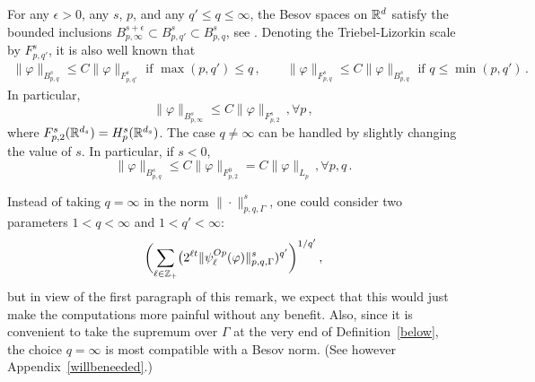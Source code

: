 \documentclass[10pt,twoside]{amsart}
\begin{document}
\begin{remark}\label{qqq}
For  any $\epsilon >0$, any $s$, $p$, and any $q'\le q\le \infty$,
the  Besov spaces on $\mathbb{R}^d$ satisfy the bounded inclusions
$B^{s+\epsilon}_{p,\infty}\subset  B^s_{p,q'}\subset B^{s}_{p,q}$, see \cite[\S 2.2.1]{RS}.
Denoting the Triebel-Lizorkin scale by $F^s_{p,q'}$,
it is also well known 
\cite[\S 2.2.2]{RS}  that 
\begin{align}\label{cumbersome}
\|\varphi\|_{B^s_{p,q}}\le C \|\varphi\|_{F^s_{p,q'}}
\mbox{ if }\max(p,q')\le q\, , \qquad
\|\varphi\|_{F^s_{p,q}}\le C \|\varphi\|_{B^s_{p,q}}
\mbox{ if } q \le \min(p,q')\, .
\end{align}
 In particular, 
\begin{equation}\label{forlater}
\|\varphi\|_{B^s_{p,\infty}}\le C \|\varphi\|_{F^s_{p,2}} \, , \forall p\, ,
\end{equation}
where \cite[\S 2.1.2]{RS} $F^s_{p,2}(\mathbb{R}^{d_s})=H^s_p(\mathbb{R}^{d_s})$.
The case $q\ne \infty$ can be handled by slightly changing the
value of $s$. In particular, if $s<0$,
$$
\|\varphi\|_{B^s_{p,q}}\le C \|\varphi\|_{F^0_{p,2}}=C \|\varphi\|_{L_p}\, , \forall p, q\, .
$$

Instead of taking $q=\infty$ 
in the norm $\|\cdot \|^s_{p,q,\Gamma}$, one could 
consider two parameters $1<q<\infty$ and $1<q'<\infty$:
\begin{equation*}
\biggl ( \sum_{\ell \in \mathbb{Z}_+}
\bigl ( 2^{\ell t}   \|  \psi_{\ell}^{Op} (\varphi )\|^s_{p,q,\Gamma})^{q'}\biggr )^{1/q'}\, ,
\end{equation*}
but in view of the first paragraph of this remark,
we expect that  this would just make the computations more painful
without any benefit. 
Also, since
it is convenient to take the supremum over $\Gamma$ at the
very end of Definition~\ref{below}, the choice $q=\infty$ is most compatible
with a Besov norm. (See however Appendix~\ref{willbeneeded}.) 
\end{remark}
\end{document}
